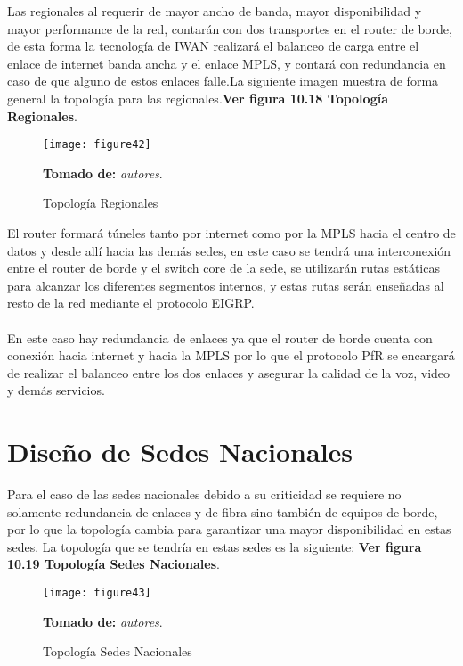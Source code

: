 Las regionales al requerir de mayor ancho de banda, mayor disponibilidad y mayor performance de la red, contarán con dos transportes en el router de borde, de esta forma la tecnología de IWAN realizará el balanceo de carga entre el enlace de internet banda ancha y el enlace MPLS, y contará con redundancia en caso de que alguno de estos enlaces falle.La siguiente imagen muestra de forma general la topología para las regionales.\textbf{Ver figura 10.18 Topología Regionales}.

\begin{figure}[htbp]
  \centering
    {\texttt{[image: figure42]}}%
  \caption{Topología Regionales}
  \textbf{Tomado de:} \textit{autores}.
  \label{fig:fig2subfig}
\end{figure}

El router formará túneles tanto por internet como por la MPLS hacia el centro de datos y desde allí hacia las demás sedes, en este caso se tendrá una interconexión entre el router de borde y el switch core de la sede, se utilizarán rutas estáticas para alcanzar los diferentes segmentos internos, y estas rutas serán enseñadas al resto de la red mediante el protocolo EIGRP.
\\
\\
En este caso hay redundancia de enlaces ya que el router de borde cuenta con conexión hacia internet y hacia la MPLS por lo que el protocolo PfR se encargará de realizar el balanceo entre los dos enlaces y asegurar la calidad de la voz, video y demás servicios.

\section{Diseño de Sedes Nacionales} %
\label{sec:Diseño de Sedes Nacionales}

Para el caso de las sedes nacionales debido a su criticidad se requiere no solamente redundancia de enlaces y de fibra sino también de equipos de borde, por lo que la topología cambia para garantizar una mayor disponibilidad en estas sedes. La topología que se tendría en estas sedes es la siguiente: \textbf{Ver figura 10.19 Topología Sedes Nacionales}.

\begin{figure}[htbp]
  \centering
    {\texttt{[image: figure43]}}%
  \caption{Topología Sedes Nacionales}
  \textbf{Tomado de:} \textit{autores}.
  \label{fig:fig2subfig}
\end{figure}

